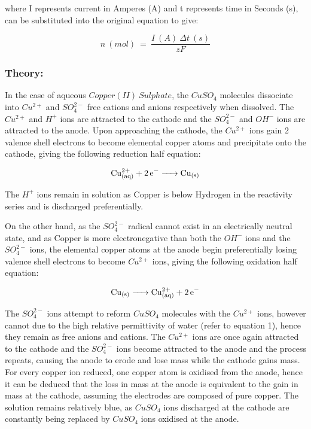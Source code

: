 \documentclass[11pt, a4]{article}
\begin{document}
			where I represents current in Amperes (A) and t represents time in Seconds (s), can be substituted into the original equation to give:
			
			\begin{equation}
				n \ (mol) \ = \ \frac{I \ (A) \ \Delta t \ (s)}{zF}
			\end{equation}
			
			\subsubsection{Theory:}
				In the case of aqueous $Copper(II) \ Sulphate$, the $CuSO_{4}$ molecules dissociate into $Cu^{2+}$ and $SO_{4}^{2-}$ free cations and anions respectively when dissolved. The $Cu^{2+}$ and $H^{+}$ ions are attracted to the cathode and the $SO_{4}^{2-}$ and $OH^{-}$ ions are attracted to the anode. Upon approaching the cathode, the $Cu^{2+}$ ions gain 2 valence shell electrons to become elemental copper atoms and precipitate onto the cathode, giving the following reduction half equation:
				
				\begin{equation}
					\ce{Cu^{2+}_{(aq)} + 2e^{-} -> Cu_{(s)}}
				\end{equation}
				
				The $H^{+}$ ions remain in solution as Copper is below Hydrogen in the reactivity series and is discharged preferentially.
				
				\bigbreak
				
				On the other hand, as the $SO_{4}^{2-}$ radical cannot exist in an electrically neutral state, and as Copper is more electronegative than both the $OH^{-}$ ions and the $SO_{4}^{2-}$ ions, the elemental copper atoms at the anode begin preferentially losing valence shell electrons to become $Cu^{2+}$ ions, giving the following oxidation half equation:
				
				\begin{equation}
					\ce{Cu_{(s)} -> Cu^{2+}_{(aq)} + 2e^{-}}
				\end{equation}
				
				The $SO_{4}^{2-}$ ions attempt to reform $CuSO_{4}$ molecules with the $Cu^{2+}$ ions, however cannot due to the high relative permittivity of water (refer to equation 1), hence they remain as free anions and cations. The $Cu^{2+}$ ions are once again attracted to the cathode and the $SO_{4}^{2-}$ ions become attracted to the anode and the process repeats, causing the anode to erode and lose mass while the cathode gains mass. For every copper ion reduced, one copper atom is oxidised from the anode, hence it can be deduced that the loss in mass at the anode is equivalent to the gain in mass at the cathode, assuming the electrodes are composed of pure copper. The solution remains relatively blue, as $CuSO_{4}$ ions discharged at the cathode are constantly being replaced by $CuSO_{4}$ ions oxidised at the anode.
			
\end{document}
